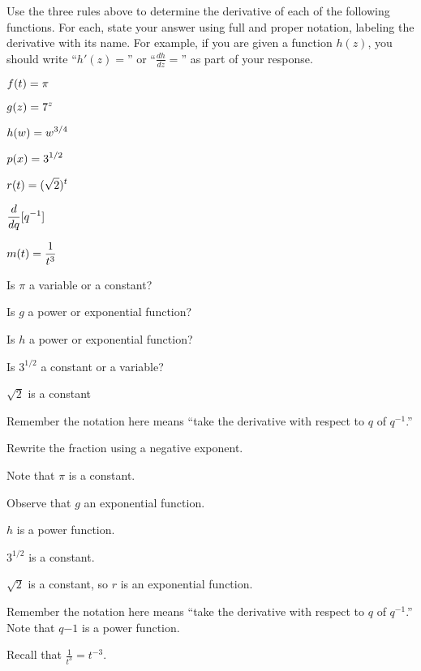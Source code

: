 \begin{activity} \label{A:2.1.1}  Use the three rules above to determine the derivative of each of the following functions.  For each, state your answer using full and proper notation, labeling the derivative with its name.  For example, if you are given a function $h(z)$, you should write ``$h'(z) = $'' or ``$\frac{dh}{dz} = $'' as part of your response.

\bmthree
\ba
	\item $\displaystyle f(t) = \pi$
	\item $\displaystyle g(z) = 7^z$
	\item $\displaystyle h(w) = w^{3/4}$
	\item $\displaystyle p(x) = 3^{1/2}$
	\item $\displaystyle r(t) = (\sqrt{2})^t$
	\item $\displaystyle \frac{d}{dq}[q^{-1}]$
	\item $\displaystyle m(t) = \frac{1}{t^3}$
\ea
\emthree

\end{activity}
\begin{smallhint}
\ba
	\item Is $\pi$ a variable or a constant?
	\item Is $g$ a power or exponential function?
	\item Is $h$ a power or exponential function?
	\item Is $3^{1/2}$ a constant or a variable?
	\item $\sqrt{2}$ is a constant
	\item Remember the notation here means ``take the derivative with respect to $q$ of $q^{-1}$.''
	\item Rewrite the fraction using a negative exponent.
\ea
\end{smallhint}
\begin{bighint}
\ba
	\item Note that $\pi$ is a constant.
	\item Observe that $g$ an exponential function.
	\item $h$ is a power function.
	\item $3^{1/2}$ is a constant.
	\item $\sqrt{2}$ is a constant, so $r$ is an exponential function.
	\item Remember the notation here means ``take the derivative with respect to $q$ of $q^{-1}$.''  Note that $q{-1}$ is a power function.
	\item Recall that $\frac{1}{t^3} = t^{-3}$.
\ea
\end{bighint}
